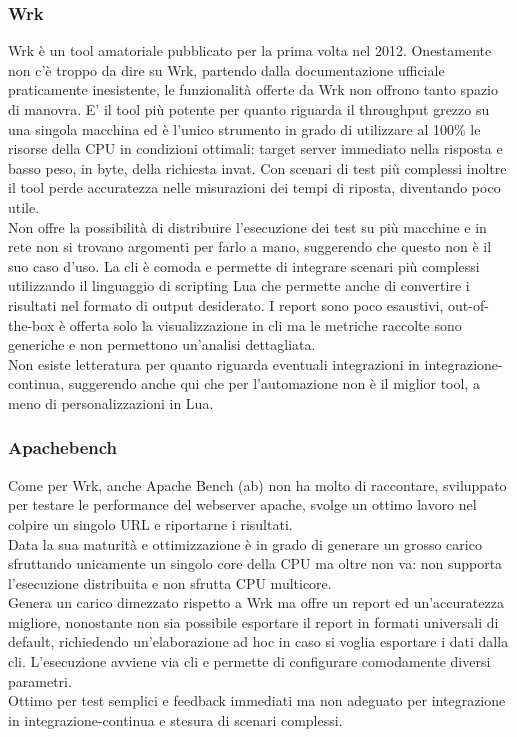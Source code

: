 \subsubsection{Wrk}
Wrk è un tool amatoriale pubblicato per la prima volta nel 2012.
Onestamente non c’è troppo da dire su Wrk, partendo dalla documentazione ufficiale praticamente inesistente, le funzionalità offerte da Wrk non offrono tanto spazio di manovra.
E’ il tool più potente per quanto riguarda il throughput grezzo su una singola macchina ed è l’unico strumento in grado di utilizzare al 100\% le risorse della CPU in condizioni ottimali: target server immediato nella risposta e basso peso, in byte, della richiesta invat. Con scenari di test più complessi inoltre il tool perde accuratezza nelle misurazioni dei tempi di riposta, diventando poco utile. \\
Non offre la possibilità di distribuire l’esecuzione dei test su più macchine e in rete non si trovano argomenti per farlo a mano, suggerendo che questo non è il suo caso d'uso.
La \gls{cli} è comoda e permette di integrare scenari più complessi utilizzando il linguaggio di scripting Lua che permette anche di convertire i risultati nel formato di output desiderato.
I report sono poco esaustivi, \gls{out-of-the-box} è offerta solo la visualizzazione in \gls{cli} ma le metriche raccolte sono generiche e non permettono un’analisi dettagliata.\\
Non esiste letteratura per quanto riguarda eventuali integrazioni in \gls{integrazione-continua}, suggerendo anche qui che per l’automazione non è il miglior tool, a meno di personalizzazioni in Lua.
\subsubsection{Apachebench}
Come per Wrk, anche Apache Bench (ab) non ha molto di raccontare, sviluppato per testare le performance del webserver apache, svolge un ottimo lavoro nel colpire un singolo URL e riportarne i risultati.\\
Data la sua maturità e ottimizzazione è in grado di generare un grosso carico sfruttando unicamente un singolo core della CPU ma oltre non va: non supporta l’esecuzione distribuita e non sfrutta CPU multicore. \\
Genera un carico dimezzato rispetto a Wrk ma offre un report ed un’accuratezza migliore, nonostante non sia possibile esportare il report in formati universali di default, richiedendo un'elaborazione ad hoc in caso si voglia esportare i dati dalla \gls{cli}.
L'esecuzione avviene via \gls{cli} e permette di configurare comodamente diversi parametri.\\
Ottimo per test semplici e feedback immediati ma non adeguato per integrazione in \gls{integrazione-continua} e stesura di scenari complessi.
